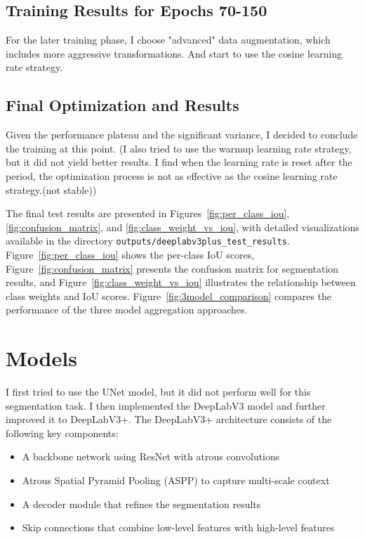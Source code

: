 \documentclass[]{article}
\begin{document}
\subsection{Training Results for Epochs 70-150}
For the later training phase, I choose "advanced" data augmentation, which includes more aggressive transformations. And start to use the cosine learning rate strategy. 



\subsection{Final Optimization and Results}\label{sec:Final_Optimization}
Given the performance plateau and the significant variance, I decided to conclude the training at this point. (I also tried to use the warmup learning rate strategy, but it did not yield better results. I find when the learning rate is reset after the period, the optimization process is not as effective as the cosine learning rate strategy.(not stable))

The final test results are presented in Figures~\ref{fig:per_class_iou}, \ref{fig:confusion_matrix}, and \ref{fig:class_weight_vs_iou}, with detailed visualizations available in the directory \texttt{outputs/deeplabv3plus\_test\_results}. Figure~\ref{fig:per_class_iou} shows the per-class IoU scores, Figure~\ref{fig:confusion_matrix} presents the confusion matrix for segmentation results, and Figure~\ref{fig:class_weight_vs_iou} illustrates the relationship between class weights and IoU scores. Figure~\ref{fig:3model_comparison} compares the performance of the three model aggregation approaches.


\section{Models}\label{sec:Models}
I first tried to use the UNet model, but it did not perform well for this segmentation task. I then implemented the DeepLabV3 model and further improved it to DeepLabV3+. The DeepLabV3+ architecture consists of the following key components:

\begin{itemize}
    \item A backbone network using ResNet with atrous convolutions
    \item Atrous Spatial Pyramid Pooling (ASPP) to capture multi-scale context
    \item A decoder module that refines the segmentation results
    \item Skip connections that combine low-level features with high-level features
\end{itemize}
\end{document}

